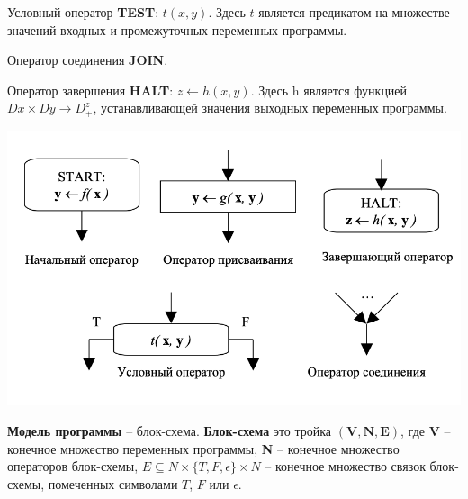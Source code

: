 Условный оператор \textbf{TEST}: $t(x, y)$. Здесь $t$ является предикатом на множестве значений входных и промежуточных переменных программы.

Оператор соединения  \textbf{JOIN}.

Оператор завершения  \textbf{HALT}: $z \leftarrow h(x, y)$. Здесь h является функцией $Dx \times Dy \rightarrow D^z_+$, устанавливающей значения выходных переменных программы.

\includegraphics[scale=0.2]{pics/halt.png}

\textbf{Модель программы} -- блок-схема. \textbf{Блок-схема} это тройка $(\textbf{V}, \textbf{N}, \textbf{E})$, где \textbf{V} -- конечное множество переменных программы, \textbf{N} -- конечное множество операторов блок-схемы, $E \subseteq N \times \{ T, F, \epsilon \} \times N$ -- конечное множество связок блок-схемы, помеченных символами $T$, $F$ или $\epsilon$.

